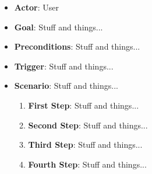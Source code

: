 \documentclass{article}
\begin{document}
\begin{itemize}
    \item \textbf{Actor}: User
    \item \textbf{Goal}: Stuff and things...
    \item \textbf{Preconditions}: Stuff and things...
    \item \textbf{Trigger}: Stuff and things...
    \item \textbf{Scenario}: Stuff and things...
    \begin{enumerate}
    \item \textbf{First Step}: Stuff and things...
    \item \textbf{Second Step}: Stuff and things...
    \item \textbf{Third Step}: Stuff and things...
    \item \textbf{Fourth Step}: Stuff and things...
    \end{enumerate}
\end{itemize}

\newpage

\printbibliography

{\parindent0pt}
\end{document}
